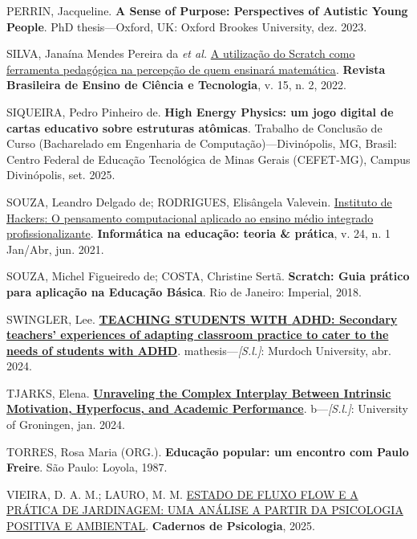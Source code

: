 \documentclass[
  12pt,
  a4paper,
]{article}
\newlength{\cslhangindent}
\newlength{\cslentryspacingunit} %
\newenvironment{CSLReferences}[2] %
 {%
  \setlength{\parindent}{0pt}
  \ifodd #1
  \let\oldpar\par
  \def\par{\hangindent=\cslhangindent\oldpar}
  \fi
  \setlength{\parskip}{#2\cslentryspacingunit}
 }%
 {}
\begin{document}
\begin{CSLReferences}{0}{1}
\leavevmode{}%
PERRIN, Jacqueline. \textbf{A {Sense} of {Purpose}: {Perspectives} of
{Autistic} {Young} {People}}. PhD thesis---Oxford, UK: Oxford Brookes
University, dez. 2023.

\leavevmode{}%
SILVA, Janaína Mendes Pereira da \emph{et al.}
\href{https://doi.org/10.3895/rbect.v15n2.9614}{A utilização do
{Scratch} como ferramenta pedagógica na percepção de quem ensinará
matemática}. \textbf{Revista Brasileira de Ensino de Ciência e
Tecnologia}, v. 15, n. 2, 2022.

\leavevmode{}%
SIQUEIRA, Pedro Pinheiro de. \textbf{High {Energy} {Physics}: um jogo
digital de cartas educativo sobre estruturas atômicas}. Trabalho de
Conclusão de Curso (Bacharelado em Engenharia de
Computação)---Divinópolis, MG, Brasil: Centro Federal de Educação
Tecnológica de Minas Gerais (CEFET-MG), Campus Divinópolis, set. 2025.

\leavevmode{}%
SOUZA, Leandro Delgado de; RODRIGUES, Elisângela Valevein.
\href{https://doi.org/10.22456/1982-1654.109902}{Instituto de {Hackers}:
{O} pensamento computacional aplicado ao ensino médio integrado
profissionalizante}. \textbf{Informática na educação: teoria \&
prática}, v. 24, n. 1 Jan/Abr, jun. 2021.

\leavevmode{}%
SOUZA, Michel Figueiredo de; COSTA, Christine Sertã. \textbf{Scratch:
Guia pr{á}tico para aplica{ç}{ã}o na Educa{ç}{ã}o B{á}sica}. Rio de
Janeiro: Imperial, 2018.

\leavevmode{}%
SWINGLER, Lee.
\textbf{\href{https://researchportal.murdoch.edu.au/esploro/outputs/graduate/TEACHING-STUDENTS-WITH-ADHD-Secondary-teachers/991005714570107891}{{TEACHING}
{STUDENTS} {WITH} {ADHD}: {Secondary} teachers' experiences of adapting
classroom practice to cater to the needs of students with {ADHD}}}.
mathesis---\emph{{[}S.l.{]}}: Murdoch University, abr. 2024.

\leavevmode{}%
TJARKS, Elena.
\textbf{\href{https://gmwpublic.studenttheses.ub.rug.nl/3037/}{Unraveling
the {Complex} {Interplay} {Between} {Intrinsic} {Motivation},
{Hyperfocus}, and {Academic} {Performance}}}. b---\emph{{[}S.l.{]}}:
University of Groningen, jan. 2024.

\leavevmode{}%
TORRES, Rosa Maria (ORG.). \textbf{Educação popular: um encontro com
Paulo Freire}. São Paulo: Loyola, 1987.

\leavevmode{}%
VIEIRA, D. A. M.; LAURO, M. M.
\href{http://seer.uniacademia.edu.br/index.php/cadernospsicologia/article/view/4501}{ESTADO
DE FLUXO FLOW E A PRÁTICA DE JARDINAGEM: UMA ANÁLISE A PARTIR DA
PSICOLOGIA POSITIVA E AMBIENTAL}. \textbf{Cadernos de Psicologia}, 2025.

\end{CSLReferences}
\end{document}
